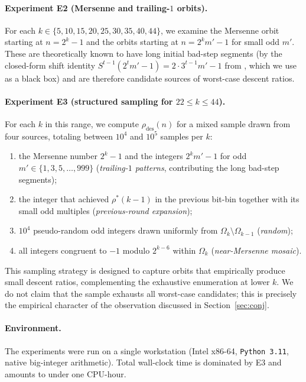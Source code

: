 \documentclass[11pt,a4paper]{article}
\theoremstyle{definition}
\theoremstyle{remark}
\begin{document}
\paragraph{Experiment E2 (Mersenne and trailing-$1$ orbits).}
For each $k \in \{5, 10, 15, 20, 25, 30, 35, 40, 44\}$, we examine
the Mersenne orbit starting at $n = 2^k - 1$ and the orbits starting
at $n = 2^k m' - 1$ for small odd $m'$.  These are theoretically
known to have long initial bad-step segments (by the closed-form
shift identity $S^{t-1}(2^t m' - 1) = 2 \cdot 3^{t-1} m' - 1$ from
\cite{ChangPaperA}, which we use as a black box) and are therefore
candidate sources of worst-case descent ratios.

\paragraph{Experiment E3 (structured sampling for $22 \leq k \leq 44$).}
For each $k$ in this range, we compute $\rho_{\mathrm{des}}(n)$ for a
mixed sample drawn from four sources, totaling between $10^4$ and
$10^5$ samples per $k$:
\begin{enumerate}[label=(\alph*),leftmargin=2em]
  \item the Mersenne number $2^k - 1$ and the integers
    $2^k m' - 1$ for odd $m' \in \{1, 3, 5, \ldots, 999\}$
    (\emph{trailing-$1$ patterns}, contributing the long bad-step
    segments);
  \item the integer that achieved $\rho^{*}(k - 1)$ in the previous
    bit-bin together with its small odd multiples
    (\emph{previous-round expansion});
  \item $10^4$ pseudo-random odd integers drawn uniformly from
    $\Omega_k \setminus \Omega_{k-1}$ (\emph{random});
  \item all integers congruent to $-1$ modulo $2^{k - 6}$ within
    $\Omega_k$ (\emph{near-Mersenne mosaic}).
\end{enumerate}
This sampling strategy is designed to capture orbits that empirically
produce small descent ratios, complementing the exhaustive enumeration
at lower $k$.  We do not claim that the sample exhausts all worst-case
candidates; this is precisely the empirical character of the
observation discussed in Section~\ref{sec:conj}.

\paragraph{Environment.}
The experiments were run on a single workstation (Intel x86-64,
\texttt{Python 3.11}, native big-integer arithmetic).  Total wall-clock
time is dominated by E3 and amounts to under one CPU-hour.
\end{document}

